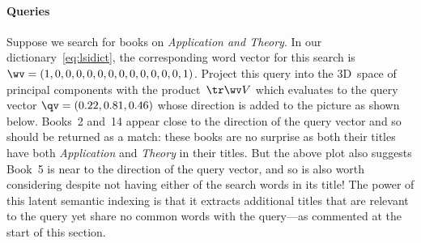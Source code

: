 \paragraph{Queries}
Suppose we search for books on \emph{Application and Theory}.
In our dictionary~\eqref{eq:lsidict}, the corresponding word vector for this search is \(\wv=(1,0,0,0,0,0,0,0,0,0,0,0,0,1)\).
Project this query into the 3D~space of principal components with the product~\(\tr\wv V\) which evaluates to the query vector \(\qv=(0.22,0.81,0.46)\) whose direction is added to the picture as shown below.
Books~2 and~14 appear close to the direction of the query vector and so should be returned as a match: these books are no surprise as both their titles have both \emph{Application} and \emph{Theory} in their titles.
But the above plot also suggests Book~5 is near to the direction of the query vector, and so is also worth considering despite not having either of the search words in its title!
The power of this latent semantic indexing is that it extracts additional titles that are relevant to the query yet share no common words with the query---as commented at the start of this section.

